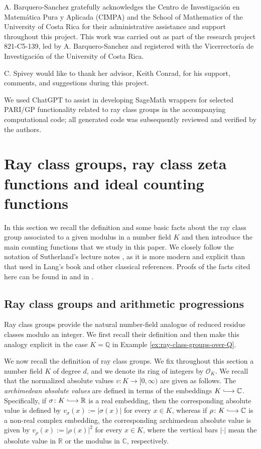 \documentclass[11pt, reqno]{amsart}
\numberwithin{equation}{section}
\newcommand{\hooklongrightarrow}{\lhook\joinrel\longrightarrow}
\newcommand{\C}{\mathbb{C}}
\newcommand{\R}{\mathbb{R}}
\theoremstyle{definition}
\begin{document}
A. Barquero-Sanchez gratefully acknowledges the Centro de Investigación en Matemática Pura y Aplicada (CIMPA) and the School of Mathematics of the University of Costa Rica for their administrative assistance and support throughout this project. This work was carried out as part of the research project 821-C5-139, led by A. Barquero-Sanchez and registered with the Vicerrectoría de Investigación of the University of Costa Rica.

C. Spivey would like to thank her advisor, Keith Conrad, for his support, comments, and suggestions during this project.

We used ChatGPT to assist in developing SageMath wrappers for selected PARI/GP functionality related to ray class groups in the accompanying computational code; all generated code was subsequently reviewed and verified by the authors.




\section{Ray class groups, ray class zeta functions and ideal counting functions}\label{section:ray-class-groups}

In this section we recall the definition and some basic facts about the ray class group associated to a given modulus in a number field $K$ and then introduce the main counting functions that we study in this paper. We closely follow the notation of Sutherland's lecture notes \cite{Sut21}, as it is more modern and explicit than that used in Lang's book and other classical references. Proofs of the facts cited here can be found in \cite[Chaps. VI and VIII]{Lan94} and in \cite{Sut21}.

\subsection{Ray class groups and arithmetic progressions}

Ray class groups provide the natural number-field analogue of reduced residue classes modulo an integer. We first recall their definition and then make this analogy explicit in the case $K=\mathbb{Q}$ in Example \ref{ex:ray-class-groups-over-Q}.

We now recall the definition of ray class groups. We fix throughout this section a number field $K$ of degree $d$, and we denote its ring of integers by $\mathcal{O}_K$. We recall that the normalized absolute values $v \colon K \longrightarrow [0, \infty)$ are given as follows. The \textit{archimedean absolute values} are defined in terms of the embeddings $K \hooklongrightarrow \C$. Specifically, if $\sigma \colon K \hooklongrightarrow \R$ is a real embedding, then the corresponding absolute value is defined by $v_{\sigma}(x) := |\sigma(x)|$ for every $x \in K$, whereas if $\rho \colon K \hooklongrightarrow \C$ is a non-real complex embedding, the corresponding archimedean absolute value is given by $v_{\rho}(x) := |\rho(x)|^2$ for every $x \in K$, where the vertical bars $|\cdot|$ mean the absolute value in $\R$ or the modulus in $\C$, respectively.
\end{document}
